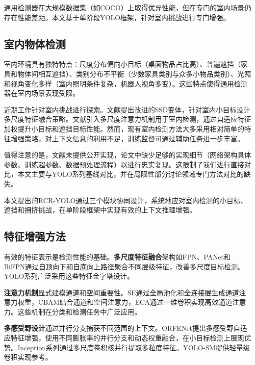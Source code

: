 \documentclass[journal]{IEEEtran}
\begin{document}
通用检测器在大规模数据集（如COCO\cite{lin2014microsoft}）上取得优异性能，但在专门的室内场景仍存在性能差距。本文基于单阶段YOLO框架，针对室内挑战进行专门增强。

\subsection{室内物体检测}
\label{subsec:indoor_detection}

室内环境具有独特特点：尺度分布偏向小目标（桌面物品占比高）、普遍遮挡（家具和物体间相互遮挡）、类别分布不平衡（少数家具类别与众多小物品类别）、光照和视角变化多样（室内照明条件复杂，机器人视角多变）。这些特点使得通用检测器在室内场景表现受限。

近期工作针对室内挑战进行探索。文献\cite{chen2020enhanced}提出改进的SSD变体，针对室内小目标设计多尺度特征融合策略。文献\cite{zhang2021indoor}引入多尺度注意力机制用于室内检测，通过自适应特征加权提升小目标和遮挡目标性能。然而，现有室内检测方法大多采用相对简单的特征增强策略，对上下文信息的利用不足，训练监督可通过辅助任务进一步丰富。

值得注意的是，文献\cite{chen2020enhanced,zhang2021indoor}未提供公开实现，论文中缺少足够的实现细节（网络架构具体参数、训练超参数、数据预处理流程）以进行忠实复现。这限制了我们进行直接对比，本文主要与YOLO系列基线对比，并在局限性部分讨论领域专门方法对比的缺失。

本文提出的RCR-YOLO通过三个模块协同设计，系统地应对室内检测的小目标、遮挡和拥挤挑战，在单阶段框架中实现有效的上下文推理增强。

\subsection{特征增强方法}
\label{subsec:feature_enhancement}

有效的特征表示是检测性能的基础。\textbf{多尺度特征融合}架构如FPN\cite{lin2017fpn}、PANet\cite{liu2018path}和BiFPN\cite{tan2020efficientdet}通过自顶向下和自底向上路径聚合不同层级特征，改善多尺度目标检测。YOLO系列广泛采用这些特征金字塔设计。

\textbf{注意力机制}显式建模通道和空间重要性。SE\cite{hu2018squeeze}通过全局池化和全连接层生成通道注意力权重，CBAM\cite{woo2018cbam}结合通道和空间注意力，ECA\cite{wang2020eca}通过一维卷积实现高效通道注意力。这些机制在分类和检测任务中广泛应用。

\textbf{多感受野设计}通过并行分支捕获不同范围的上下文。ORFENet\cite{orfe2021}提出多感受野自适应特征增强，使用不同膨胀率的并行分支和动态权重融合，在小目标检测上展现优势。Inception系列\cite{szegedy2015going}通过多尺度卷积核并行提取多粒度特征。YOLO-SM\cite{yolosm2022}提供轻量级卷积实现参考。
\end{document}
